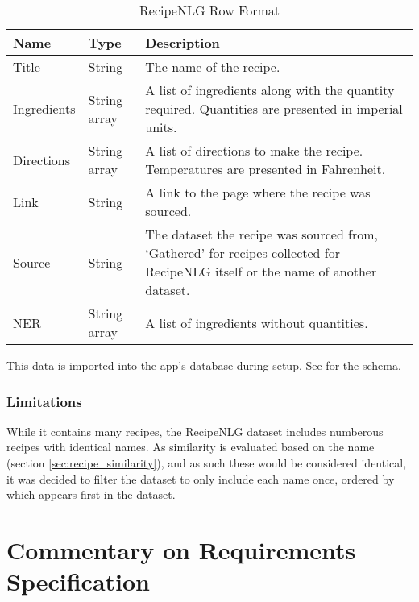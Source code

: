 \begin{table}
    \caption{RecipeNLG Row Format}\label{tab:recipenlg_row_format}

    \begin{tabulary}{\textwidth}{llL}
        \toprule
        \textbf{Name} & \textbf{Type} & \textbf{Description} \\\midrule

        Title & String & The name of the recipe.\\

        Ingredients & String array & A list of ingredients along with the quantity required. Quantities are presented in imperial units.\\

        Directions & String array & A list of directions to make the recipe. Temperatures are presented in Fahrenheit.\\

        Link & String & A link to the page where the recipe was sourced.\\

        Source & String & The dataset the recipe was sourced from, \enquote*{Gathered} for recipes collected for RecipeNLG itself or the name of another dataset.\\

        NER & String array & A list of ingredients without quantities.\\
        \bottomrule
    \end{tabulary}
\end{table}

This data is imported into the app's database during setup. See  for the schema.


\subsubsection{Limitations}
While it contains many recipes, the RecipeNLG dataset includes numberous recipes with identical names.
As similarity is evaluated based on the name (section \ref{sec:recipe_similarity}), and as such
these would be considered identical, it was decided to filter the dataset to only include each name once,
ordered by which appears first in the dataset.


\section{Commentary on Requirements Specification}

